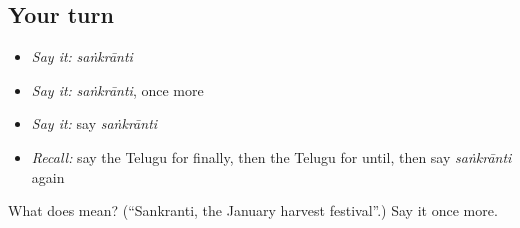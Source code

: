 \subsection*{Your turn}
\begin{itemize}
\raggedright
  \item \emph{Say it:} \emph{saṅkrānti}
  \item \emph{Say it:} \emph{saṅkrānti}, once more
  \item \emph{Say it:} say \emph{saṅkrānti}
  \item \emph{Recall:} say the Telugu for finally, then the Telugu for until, then say \emph{saṅkrānti} again
\end{itemize}

\begin{tcolorbox}[breakable,colback=teal!4,colframe=teal!35!black,title={Before you move on}]
What does  mean? (\textquotedblleft{}Sankranti, the January harvest festival\textquotedblright{}.) Say it once more.
\end{tcolorbox}
